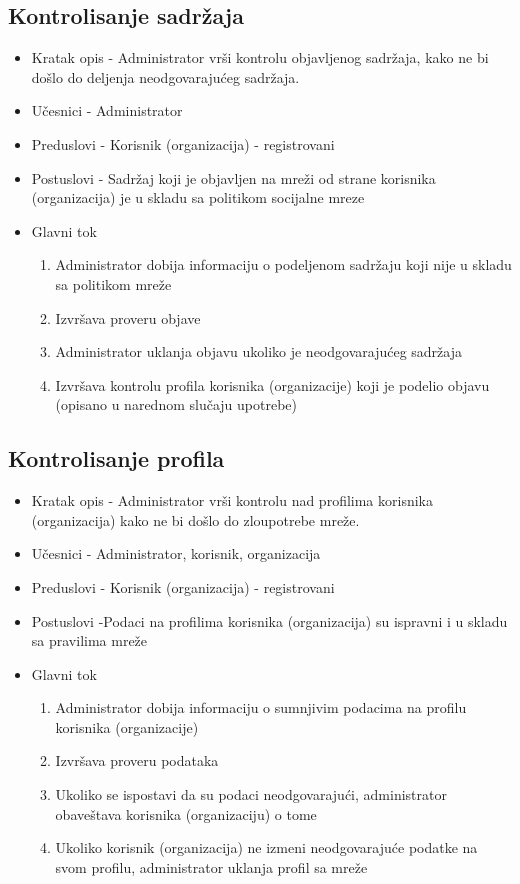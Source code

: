 \subsection{Kontrolisanje sadržaja}
\begin{itemize}
	\item Kratak opis - Administrator vrši kontrolu objavljenog sadržaja, kako ne bi došlo do deljenja neodgovarajućeg sadržaja. 
	\item Učesnici - Administrator
	\item Preduslovi - Korisnik (organizacija) - registrovani
	\item Postuslovi - Sadržaj koji je objavljen na mreži od strane korisnika (organizacija) je u skladu sa politikom socijalne mreze
	\item Glavni tok
	\begin{enumerate}
		\item Administrator dobija informaciju o podeljenom sadržaju koji nije u skladu sa politikom mreže
		\item Izvršava proveru objave
		\item Administrator uklanja objavu ukoliko je neodgovarajućeg sadržaja
		\item Izvršava kontrolu profila korisnika (organizacije) koji je podelio objavu (opisano u narednom slučaju upotrebe)
	\end{enumerate}
\end{itemize}


\subsection{Kontrolisanje profila}
\begin{itemize}
	\item Kratak opis - Administrator vrši kontrolu nad profilima korisnika (organizacija) kako ne bi došlo do zloupotrebe mreže. 
	\item Učesnici - Administrator, korisnik, organizacija
	\item Preduslovi - Korisnik (organizacija) - registrovani
	\item Postuslovi -Podaci na profilima korisnika (organizacija) su ispravni i u skladu sa pravilima mreže
	\item Glavni tok
	\begin{enumerate}
		\item Administrator dobija informaciju o sumnjivim podacima na profilu korisnika (organizacije)
		\item Izvršava proveru podataka
		\item Ukoliko se ispostavi da su podaci neodgovarajući, administrator obaveštava korisnika (organizaciju) o tome
		\item Ukoliko korisnik (organizacija) ne izmeni neodgovarajuće podatke na svom profilu, administrator uklanja profil sa mreže
	\end{enumerate}
\end{itemize}


